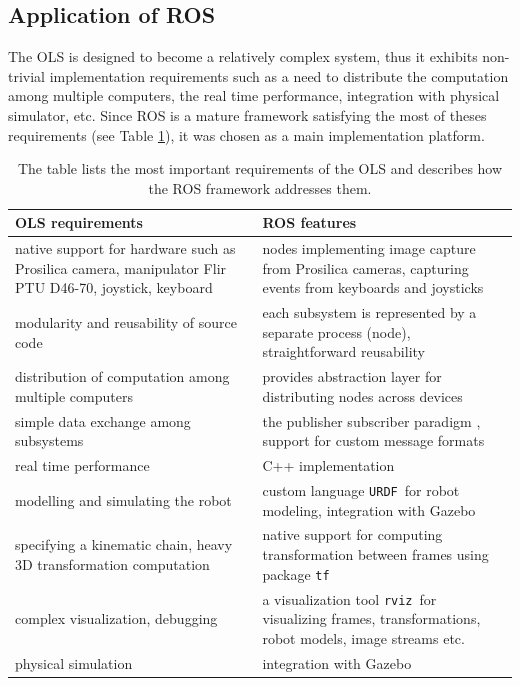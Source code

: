 \subsection{Application of ROS}

The OLS is designed to become a relatively complex system, thus it exhibits non-trivial implementation requirements such as a need to distribute the computation among multiple computers, the real time performance, integration with physical simulator, etc. Since ROS is a mature framework satisfying the most of theses requirements (see Table \ref{tab:ols_requirements_ros_features}), it was chosen as a main implementation platform.


{\renewcommand{\arraystretch}{1.5}
\begin{table}[htbp]
	\centering
	\caption{The table lists the most important requirements of the OLS and describes how the ROS framework addresses them.}
	\begin{tabularx}{0.99\textwidth}{XX}
		\toprule
		\textbf{OLS requirements} & \textbf{ROS features} \\
		\midrule
		native support for hardware such as Prosilica camera, manipulator Flir PTU D46-70, joystick, keyboard & nodes implementing image capture from Prosilica cameras, capturing events from keyboards and joysticks \\
		modularity and reusability of source code & each subsystem is represented by a separate process (node), straightforward reusability \\
		distribution of computation among multiple computers & provides abstraction layer for distributing nodes across devices \\
		simple data exchange among subsystems & the publisher subscriber paradigm \cite{O'Kane201310}, support for custom message formats \\
		real time performance & C++ implementation \\
		modelling and simulating the robot & custom language \texttt{URDF}\footnotemark ~for robot modeling, integration with Gazebo \\
		specifying a kinematic chain, heavy 3D transformation computation & native support for computing transformation between frames using package \texttt{tf} \\
		complex visualization, debugging & a visualization tool \texttt{rviz}\footnotemark ~for visualizing frames, transformations, robot models, image streams etc. \\
		physical simulation & integration with Gazebo \\
		\bottomrule
	\end{tabularx}
	\label{tab:ols_requirements_ros_features}
\end{table}}

